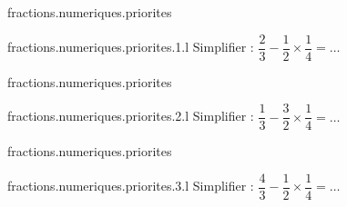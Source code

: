 \begin{qcm}{fractions.numeriques.priorites}
    \begin{question}{fractions.numeriques.priorites.1.l}
          Simplifier : \( \dfrac{2}{3}-\dfrac{1}{2}\times\dfrac{1}{4}=\ldots\) 
      \begin{multicols}{3}
         \begin{reponses}
         \end{reponses}
      \end{multicols}
    \end{question}
\end{qcm}

\begin{qcm}{fractions.numeriques.priorites}
    \begin{question}{fractions.numeriques.priorites.2.l}
          Simplifier : \( \dfrac{1}{3}-\dfrac{3}{2}\times\dfrac{1}{4}=\ldots\) 
      \begin{multicols}{3}
         \begin{reponses}
         \end{reponses}
      \end{multicols}
    \end{question}
\end{qcm}

\begin{qcm}{fractions.numeriques.priorites}
    \begin{question}{fractions.numeriques.priorites.3.l}
          Simplifier : \( \dfrac{4}{3}-\dfrac{1}{2}\times\dfrac{1}{4}=\ldots\) 
      \begin{multicols}{3}
         \begin{reponses}
         \end{reponses}
      \end{multicols}
    \end{question}
\end{qcm}


